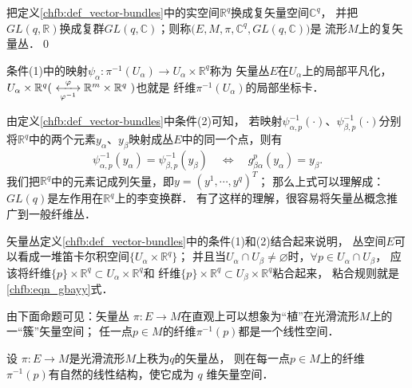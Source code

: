 \begin{definition}
把定义\ref{chfb:def_vector-bundles}中的实空间$\mathbb{R}^q$换成{\kaishu 复}矢量空间$\mathbb{C}^q$，
并把$GL(q,\mathbb{R})$换成复群$GL(q,\mathbb{C})$；则称$\bigl(E,M,\pi,\mathbb{C}^q,GL(q,\mathbb{C})\bigr)$是
流形$M$上的{\heiti 复矢量丛}．\qed
\end{definition}

     

条件(1)中的映射$\psi_\alpha:\pi^{-1}(U_\alpha) \to U_\alpha \times \mathbb{R}^q$称为
矢量丛$E$在$U_\alpha$上的{\heiti 局部平凡化}，
$U_\alpha \times \mathbb{R}^q (\ \xleftrightarrow[\varphi^{-1}]{\varphi} 
\mathbb{R}^m \times \mathbb{R}^q\ )$也就是
纤维$\pi^{-1}(U_\alpha)$的局部坐标卡． 




由定义\ref{chfb:def_vector-bundles}中条件(2)可知，
若映射$\psi^{-1}_{\alpha,p}(\cdot)$、$\psi^{-1}_{\beta,p}(\cdot)$分别
将$\mathbb{R}^q$中的两个元素$y_\alpha$、$y_\beta$映射成丛$E$中的同一个点，则有
\begin{equation}\label{chfb:eqn_gbayy}
    \psi^{-1}_{\alpha,p}(y_\alpha) = \psi^{-1}_{\beta,p}(y_\beta)
    \quad \Leftrightarrow \quad
    g^p_{\beta \alpha}(y_\alpha) = y_\beta .
\end{equation}
我们把$\mathbb{R}^q$中的元素记成列矢量，即$y=(y^1,\cdots, y^q)^T$；
那么上式可以理解成：$GL(q)$是左作用在$\mathbb{R}^q$上的李变换群．
有了这样的理解，很容易将矢量丛概念推广到一般纤维丛．



矢量丛定义\ref{chfb:def_vector-bundles}中的条件(1)和(2)结合起来说明，
丛空间$E$可以看成一堆笛卡尔积空间$\{U_\alpha \times \mathbb{R}^q\}$；
并且当$U_\alpha \cap U_\beta \neq \varnothing$时，$\forall p\in U_\alpha \cap U_\beta$，
应该将纤维$\{p\}\times \mathbb{R}^q \subset U_\alpha \times \mathbb{R}^q$和
纤维$\{p\}\times \mathbb{R}^q \subset U_\beta \times \mathbb{R}^q$粘合起来，
粘合规则就是\eqref{chfb:eqn_gbayy}式．

由下面命题可见：矢量丛 $\pi: E \to M$在直观上可以想象为“植”在光滑流形$M$上的一“簇”矢量空间；
任一点$p\in M$的纤维$\pi^{-1}(p)$都是一个线性空间．

\begin{proposition}\label{chfb:thm_linear-space}
设 $\pi: E \rightarrow M$是光滑流形$M$上秩为$q$的矢量丛，
则在每一点$p \in M$上的纤维 $\pi^{-1}(p)$有自然的线性结构，使它成为 $q$ 维矢量空间．
\end{proposition}

